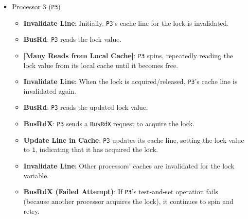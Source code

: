 \begin{itemize}
    \item Processor 3 (\texttt{P3})
    \begin{itemize}
        \item \textbf{Invalidate Line}: Initially, \texttt{P3}'s cache line for the lock is invalidated.
        \item \textbf{BusRd}: \texttt{P3} reads the lock value.
        \item \textbf{[Many Reads from Local Cache]}: \texttt{P3} spins, repeatedly reading the lock value from its local cache until it becomes free.
        \item \textbf{Invalidate Line}: When the lock is acquired/released, \texttt{P3}'s cache line is invalidated again.
        \item \textbf{BusRd}: \texttt{P3} reads the updated lock value.
        \item \textbf{BusRdX}: \texttt{P3} sends a \texttt{BusRdX} request to acquire the lock.
        \item \textbf{Update Line in Cache}: \texttt{P3} updates its cache line, setting the lock value to \texttt{1}, indicating that it has acquired the lock.
        \item \textbf{Invalidate Line}: Other processors' caches are invalidated for the lock variable.
        \item \textbf{BusRdX (Failed Attempt)}: If \texttt{P3}'s test-and-set operation fails (because another processor acquires the lock), it continues to spin and retry.
    \end{itemize}
\end{itemize}

